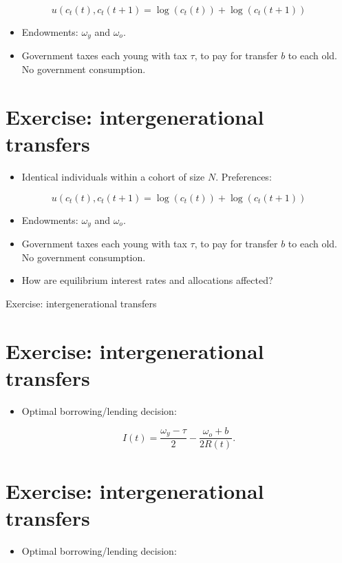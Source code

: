 \documentclass[10pt]{article}
\begin{document}
$$
u\left(c_{t}(t), c_{t}(t+1)=\log \left(c_{t}(t)\right)+\log \left(c_{t}(t+1)\right)\right.
$$

\begin{itemize}
  \item Endowments: $\omega_{y}$ and $\omega_{o}$.
  \item Government taxes each young with tax $\tau$, to pay for transfer $b$ to each old. No government consumption.
\end{itemize}

\section*{Exercise: intergenerational transfers}
\begin{itemize}
  \item Identical individuals within a cohort of size $N$. Preferences:
\end{itemize}

$$
u\left(c_{t}(t), c_{t}(t+1)=\log \left(c_{t}(t)\right)+\log \left(c_{t}(t+1)\right)\right.
$$

\begin{itemize}
  \item Endowments: $\omega_{y}$ and $\omega_{o}$.
  \item Government taxes each young with tax $\tau$, to pay for transfer $b$ to each old. No government consumption.
  \item How are equilibrium interest rates and allocations affected?
\end{itemize}

Exercise: intergenerational transfers

\section*{Exercise: intergenerational transfers}
\begin{itemize}
  \item Optimal borrowing/lending decision:
\end{itemize}

$$
I(t)=\frac{\omega_{y}-\tau}{2}-\frac{\omega_{o}+b}{2 R(t)} .
$$

\section*{Exercise: intergenerational transfers}
\begin{itemize}
  \item Optimal borrowing/lending decision:
\end{itemize}
\end{document}
